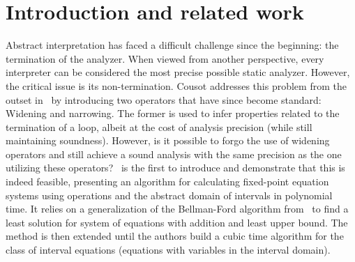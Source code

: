 \section{Introduction and related work}\label{sec:prev}

Abstract interpretation has faced a difficult challenge since the
beginning: the termination of the analyzer. When viewed from another
perspective, every interpreter can be considered the most precise
possible static analyzer. However, the critical issue is its
non-termination. Cousot addresses this problem from the outset
in~\cite{patrickradhia:one} by introducing two operators that have
since become standard: Widening and narrowing. The former is used to
infer properties related to the termination of a loop, albeit at the
cost of analysis precision (while still maintaining
soundness). However, is it possible to forgo the use of widening
operators and still achieve a sound analysis with the same precision
as the one utilizing these operators?\ \cite{Gawlitza2009} is the
first to introduce and demonstrate that this is indeed feasible,
presenting an algorithm for calculating fixed-point equation systems
using operations and the abstract domain of intervals in polynomial
time.  It relies on a generalization of the Bellman-Ford algorithm
from~\cite{bellman1958algo} to find a least solution for system of
equations with addition and least upper bound. The method is then
extended until the authors build a cubic time algorithm for the class
of interval equations (equations with variables in the interval
domain).
